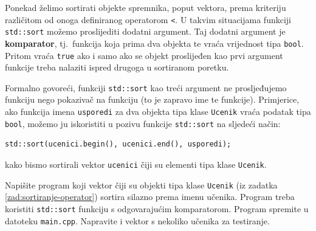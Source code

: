 Ponekad želimo sortirati objekte spremnika, poput vektora, prema kriteriju različitom od onoga definiranog operatorom \texttt{<}. 
U takvim situacijama funkciji \texttt{std::sort} možemo proslijediti dodatni argument.
Taj dodatni argument je \textbf{komparator},
tj.\ funkcija koja prima dva objekta te vraća vrijednost tipa \texttt{bool}.
Pritom vraća \texttt{true} ako i samo ako se objekt proslijeđen kao prvi argument funkcije 
treba nalaziti ispred drugoga u sortiranom poretku.
\medskip

Formalno govoreći, 
funkciji \texttt{std::sort} kao treći argument ne prosljeđujemo funkciju
nego pokazivač na funkciju (to je zapravo ime te funkcije).
Primjerice, ako funkcija imena \texttt{usporedi} za dva objekta tipa klase \texttt{Ucenik}
vraća podatak tipa \texttt{bool},
možemo ju iskoristiti u pozivu funkcije \texttt{std::sort} na sljedeći način:
\begin{verbatim}
std::sort(ucenici.begin(), ucenici.end(), usporedi);
\end{verbatim}
kako bismo sortirali vektor \texttt{ucenici} čiji su elementi tipa klase \texttt{Ucenik}.


\begin{zadatak}
Napišite program koji vektor čiji su objekti tipa klase \texttt{Ucenik}
(iz zadatka \ref{zad:sortiranje-operator})
sortira silazno prema imenu učenika.
Program treba koristiti \texttt{std::sort} funkciju s odgovarajućim komparatorom.
Program spremite u datoteku \texttt{main.cpp}. Napravite i vektor s nekoliko učenika za testiranje.
\end{zadatak}


